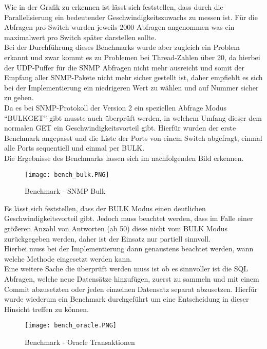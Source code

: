 Wie in der Grafik zu erkennen ist lässt sich feststellen, dass durch die Parallelisierung ein bedeutender Geschwindigkeitszuwachs zu messen ist.
Für die Abfragen pro Switch wurden jeweils 2000 Abfragen angenommen was ein maximalwert pro Switch später darstellen sollte.\\
Bei der Durchführung dieses Benchmarks wurde aber zugleich ein Problem erkannt und zwar kommt es zu Problemen bei Thread-Zahlen über 20, da hierbei der UDP-Puffer für die SNMP Abfragen nicht mehr ausreicht und somit der Empfang aller SNMP-Pakete nicht mehr sicher gestellt ist, daher empfiehlt es sich bei der Implementierung ein niedrigeren Wert zu wählen und auf Nummer sicher zu gehen.\\
Da es bei SNMP-Protokoll der Version 2 ein speziellen Abfrage Modus “BULKGET” gibt musste auch überprüft werden, in welchem Umfang dieser dem normalen GET ein Geschwindigkeitsvorteil gibt. Hierfür wurden der erste Benchmark angepasst und die Liste der Ports von einem Switch abgefragt, einmal alle Ports sequentiell und einmal per BULK.\\
Die Ergebnisse des Benchmarks lassen sich im nachfolgenden Bild erkennen.\\

\begin{figure}[H]
\centering
\texttt{[image: bench\_bulk.PNG]}
\caption{Benchmark - SNMP Bulk}
\label{fig:benchsnmpbulk}
\end{figure}

Es lässt sich feststellen, dass der BULK Modus einen deutlichen Geschwindigkeitsvorteil gibt. Jedoch muss beachtet werden, dass im Falle einer größeren Anzahl von Antworten (ab 50) diese nicht vom BULK Modus zurückgegeben werden, daher ist der Einsatz nur partiell sinnvoll.\\
Hierbei muss bei der Implementierung dann genaustens beachtet werden, wann welche Methode eingesetzt werden kann.\\

Eine weitere Sache die überprüft werden muss ist ob es sinnvoller ist die SQL Abfragen, welche neue Datensätze hinzufügen, zuerst zu sammeln und mit einem Commit abzusetzten oder jeden einzelnen Datensatz separat abzusetzen. Hierfür wurde wiederum ein Benchmark durchgeführt um eine Entscheidung in dieser Hinsicht treffen zu können.\\

\begin{figure}[H]
\centering
\texttt{[image: bench\_oracle.PNG]}
\caption{Benchmark - Oracle Transaktionen}
\label{fig:benchoracletransactions}
\end{figure}

